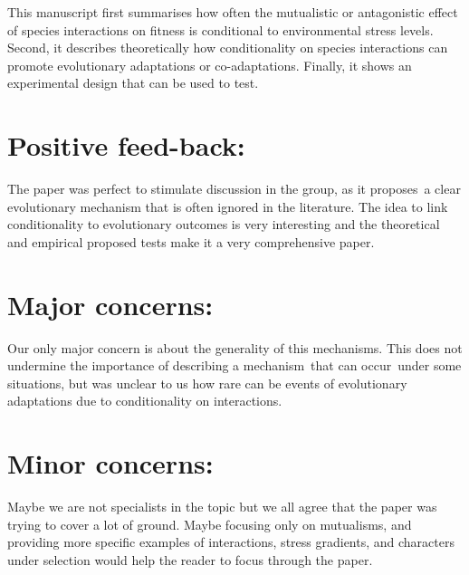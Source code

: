 \documentclass[10pt]{article}
\begin{document}
This manuscript first summarises how often the mutualistic or
antagonistic effect of species interactions on fitness is conditional to
environmental stress levels. Second, it describes theoretically how
conditionality on species interactions can promote evolutionary
adaptations or co-adaptations. Finally, it shows an experimental design
that can be used to test.

\par\null

\section*{Positive feed-back:}

{\label{495088}}

The paper was perfect to stimulate discussion in the group, as it
proposes~a clear evolutionary mechanism that is often ignored in the
literature. The idea to link conditionality to evolutionary outcomes is
very interesting and the theoretical and empirical proposed tests make
it a very comprehensive paper.~

\par\null

\section*{Major concerns:}

{\label{267722}}

Our only major concern is about the generality of this mechanisms. This
does not undermine the importance of describing a mechanism~that can
occur~under some situations, but was unclear to us how rare can be
events of evolutionary adaptations due to conditionality on
interactions.~

\par\null

\section*{Minor concerns:}

{\label{414137}}

Maybe we are not specialists in the topic but we all agree that the
paper was trying to cover a lot of ground. Maybe focusing only on
mutualisms, and providing more specific examples of interactions, stress
gradients, and characters under selection would help the reader to focus
through the paper.

\section*{}
\end{document}
